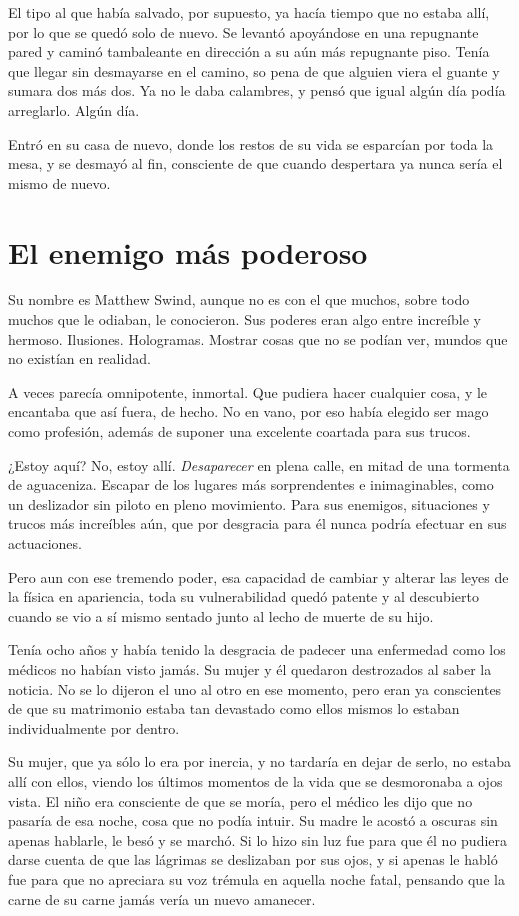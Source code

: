 El tipo al que había salvado, por supuesto, ya hacía tiempo que no estaba allí, por lo que se quedó solo de nuevo. Se levantó apoyándose en una repugnante pared y caminó tambaleante en dirección a su aún más repugnante piso. Tenía que llegar sin desmayarse en el camino, so pena de que alguien viera el guante y sumara dos más dos. Ya no le daba calambres, y pensó que igual algún día podía arreglarlo. Algún día.

Entró en su casa de nuevo, donde los restos de su vida se esparcían por toda la mesa, y se desmayó al fin, consciente de que cuando despertara ya nunca sería el mismo de nuevo.

\section*{El enemigo más poderoso}

Su nombre es Matthew Swind, aunque no es con el que muchos, sobre todo muchos que le odiaban, le conocieron. Sus poderes eran algo entre increíble y hermoso. Ilusiones. Hologramas. Mostrar cosas que no se podían ver, mundos que no existían en realidad.

A veces parecía omnipotente, inmortal. Que pudiera hacer cualquier cosa, y le encantaba que así fuera, de hecho. No en vano, por eso había elegido ser mago como profesión, además de suponer una excelente coartada para sus trucos.

¿Estoy aquí? No, estoy allí. \emph{Desaparecer} en plena calle, en mitad de una tormenta de aguaceniza. Escapar de los lugares más sorprendentes e inimaginables, como un deslizador sin piloto en pleno movimiento. Para sus enemigos, situaciones y trucos más increíbles aún, que por desgracia para él nunca podría efectuar en sus actuaciones.

Pero aun con ese tremendo poder, esa capacidad de cambiar y alterar las leyes de la física en apariencia, toda su vulnerabilidad quedó patente y al descubierto cuando se vio a sí mismo sentado junto al lecho de muerte de su hijo.

Tenía ocho años y había tenido la desgracia de padecer una enfermedad como los médicos no habían visto jamás. Su mujer y él quedaron destrozados al saber la noticia. No se lo dijeron el uno al otro en ese momento, pero eran ya conscientes de que su matrimonio estaba tan devastado como ellos mismos lo estaban individualmente por dentro.

Su mujer, que ya sólo lo era por inercia, y no tardaría en dejar de serlo, no estaba allí con ellos, viendo los últimos momentos de la vida que se desmoronaba a ojos vista. El niño era consciente de que se moría, pero el médico les dijo que no pasaría de esa noche, cosa que no podía intuir. Su madre le acostó a oscuras sin apenas hablarle, le besó y se marchó. Si lo hizo sin luz fue para que él no pudiera darse cuenta de que las lágrimas se deslizaban por sus ojos, y si apenas le habló fue para que no apreciara su voz trémula en aquella noche fatal, pensando que la carne de su carne jamás vería un nuevo amanecer.


